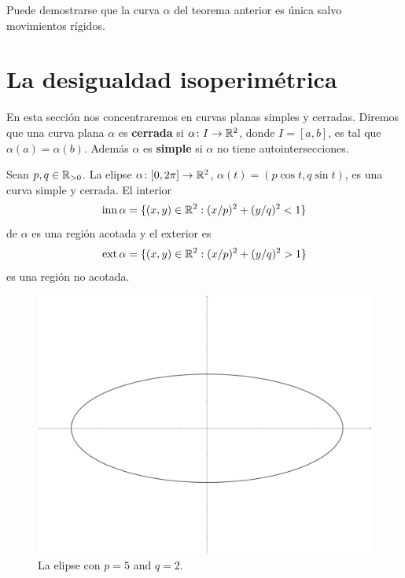 Puede demostrarse que la curva $\alpha$ del teorema anterior es única salvo
movimientos rígidos. 

\chapter{La desigualdad isoperimétrica}

En esta sección nos concentraremos en curvas planas simples y cerradas. Diremos
que una curva plana $\alpha$ es \textbf{cerrada} si $\alpha\colon I\to\mathbb{R}^2$,
donde $I=[a,b]$, es tal que $\alpha(a)=\alpha(b)$. Además $\alpha$ es
\textbf{simple} si $\alpha$ no tiene autointersecciones.

\begin{example}
	Sean $p,q\in\mathbb{R}_{>0}$. 
	La elipse $\alpha\colon [0,2\pi]\to\mathbb{R}^2$, $\alpha(t)=(p\cos t,q\sin t)$, es
	una curva simple y cerrada. El interior 
	\[
		\operatorname{inn}\alpha=\{(x,y)\in\mathbb{R}^2:(x/p)^2+(y/q)^2<1\}
	\]
	de $\alpha$ es una región acotada y el exterior 
	es 
	\[
		\operatorname{ext}\alpha=\{(x,y)\in\mathbb{R}^2:(x/p)^2+(y/q)^2>1\}
	\]
	es una región no acotada. 
	\begin{figure}
		\centering
    	\includegraphics[scale=0.05]{eps/elipse}
		\caption{La elipse con $p=5$ and $q=2$.}
		\label{fig:elipse}
	\end{figure}
\end{example}

